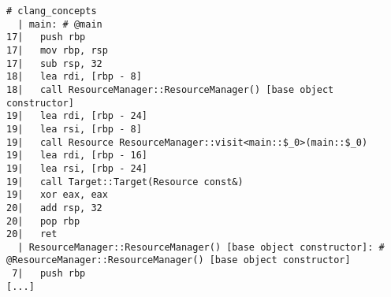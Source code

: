 \begin{lstlisting}[language={},numbers=none,title=\href{https://godbolt.org/z/p3oNMS}{\texttt{godbolt.org/z/p3oNMS}}]
# clang_concepts 
  | main: # @main
17|   push rbp
17|   mov rbp, rsp
17|   sub rsp, 32
18|   lea rdi, [rbp - 8]
18|   call ResourceManager::ResourceManager() [base object constructor]
19|   lea rdi, [rbp - 24]
19|   lea rsi, [rbp - 8]
19|   call Resource ResourceManager::visit<main::$_0>(main::$_0)
19|   lea rdi, [rbp - 16]
19|   lea rsi, [rbp - 24]
19|   call Target::Target(Resource const&)
19|   xor eax, eax
20|   add rsp, 32
20|   pop rbp
20|   ret
  | ResourceManager::ResourceManager() [base object constructor]: # @ResourceManager::ResourceManager() [base object constructor]
 7|   push rbp
[...]
\end{lstlisting}
